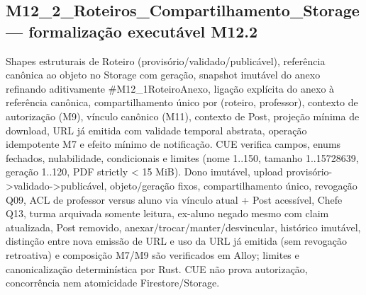 \subsection*{M12\_2\_Roteiros\_Compartilhamento\_Storage --- formalização executável M12.2}
Shapes estruturais de Roteiro (provisório/validado/publicável), referência canônica ao objeto no Storage com geração, snapshot imutável do anexo refinando aditivamente \#M12\_1RoteiroAnexo, ligação explícita do anexo à referência canônica, compartilhamento único por (roteiro, professor), contexto de autorização (M9), vínculo canônico (M11), contexto de Post, projeção mínima de download, URL já emitida com validade temporal abstrata, operação idempotente M7 e efeito mínimo de notificação. CUE verifica campos, enums fechados, nulabilidade, condicionais e limites (nome 1..150, tamanho 1..15728639, geração 1..120, PDF strictly < 15 MiB). Dono imutável, upload provisório->validado->publicável, objeto/geração fixos, compartilhamento único, revogação Q09, ACL de professor versus aluno via vínculo atual + Post acessível, Chefe Q13, turma arquivada somente leitura, ex-aluno negado mesmo com claim atualizada, Post removido, anexar/trocar/manter/desvincular, histórico imutável, distinção entre nova emissão de URL e uso da URL já emitida (sem revogação retroativa) e composição M7/M9 são verificados em Alloy; limites e canonicalização determinística por Rust. CUE não prova autorização, concorrência nem atomicidade Firestore/Storage.
